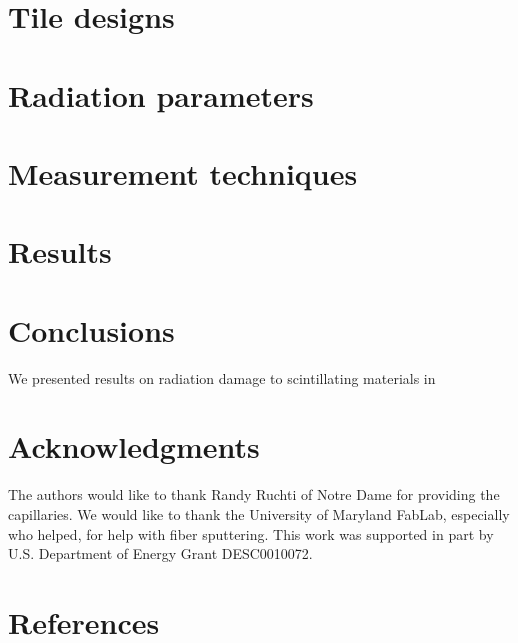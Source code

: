 \documentclass[review]{elsarticle}
\begin{document}
\section{Tile designs}
\label{sec:design}

\section{Radiation parameters}
\label{sec:radiation}

\section{Measurement techniques}
\label{sec:techniques}

\section{Results}
\label{sec:Results}


\section{Conclusions}
\label{sec:Conclusions}

We presented results on radiation damage to scintillating materials
in 


\section{Acknowledgments}
The authors would like to thank Randy Ruchti of Notre Dame for
providing the capillaries.
 We would like to thank the University of Maryland
FabLab, especially {\color{red} who helped}, for help with fiber sputtering.
This work was supported in part by U.S. Department of Energy
Grant DESC0010072.

\section*{References}


\end{document}
